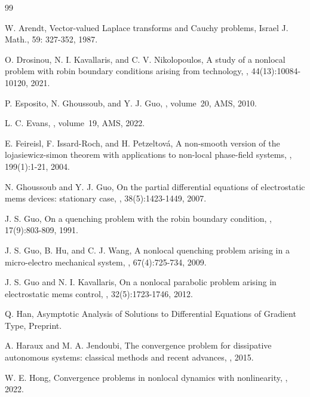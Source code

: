 \documentclass{article}
\numberwithin{equation}{section}
\begin{document}
\begin{thebibliography}{99}

W. Arendt, Vector-valued Laplace transforms and Cauchy problems, Israel J. Math., 59: 327-352, 1987.

O. Drosinou, N. I. Kavallaris, and C. V. Nikolopoulos,
\newblock A study of a nonlocal problem with robin boundary conditions arising from technology,
, 44(13):10084-10120, 2021.

P. Esposito, N. Ghoussoub, and Y. J. Guo,
, volume~20,
\newblock AMS, 2010.

L. C. Evans,
, volume~19,
\newblock AMS, 2022.

E. Feireisl, F. Issard-Roch, and H. Petzeltov{\'a},
\newblock A non-smooth version of the lojasiewicz-simon theorem with applications to non-local phase-field systems,
, 199(1):1-21, 2004.

N. Ghoussoub and Y. J. Guo,
\newblock On the partial differential equations of electrostatic mems devices: stationary case,
, 38(5):1423-1449, 2007.

J. S. Guo,
\newblock On a quenching problem with the robin boundary condition,
, 17(9):803-809, 1991.

J. S. Guo, B. Hu, and C. J. Wang,
\newblock A nonlocal quenching problem arising in a micro-electro mechanical system,
, 67(4):725-734, 2009.

J. S. Guo and N. I. Kavallaris,
\newblock On a nonlocal parabolic problem arising in electrostatic mems control,
, 32(5):1723-1746, 2012.

Q. Han,
\newblock Asymptotic Analysis of Solutions to Differential Equations of Gradient Type, Preprint.

A. Haraux and M. A. Jendoubi,
\newblock The convergence problem for dissipative autonomous systems: classical methods and recent advances,
, 2015.

W. E. Hong,
\newblock Convergence problems in nonlocal dynamics with nonlinearity,
, 2022.


\end{thebibliography}
\end{document}
